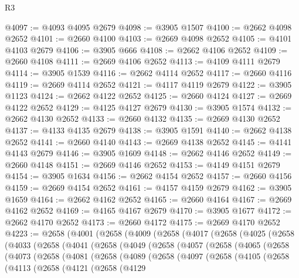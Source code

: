 \begin{lexlean}{R3}
\begin{coremodule}
@4097 := @4093 @4095 @2679
@4098 := @3905 @1507
@4100 := @2662 @4098 @2652
@4101 := @2660 @4100
@4103 := @2669 @4098 @2652
@4105 := @4101 @4103 @2679
@4106 := @3905 @666
@4108 := @2662 @4106 @2652
@4109 := @2660 @4108
@4111 := @2669 @4106 @2652
@4113 := @4109 @4111 @2679
@4114 := @3905 @1539
@4116 := @2662 @4114 @2652
@4117 := @2660 @4116
@4119 := @2669 @4114 @2652
@4121 := @4117 @4119 @2679
@4122 := @3905 @1123
@4124 := @2662 @4122 @2652
@4125 := @2660 @4124
@4127 := @2669 @4122 @2652
@4129 := @4125 @4127 @2679
@4130 := @3905 @1574
@4132 := @2662 @4130 @2652
@4133 := @2660 @4132
@4135 := @2669 @4130 @2652
@4137 := @4133 @4135 @2679
@4138 := @3905 @1591
@4140 := @2662 @4138 @2652
@4141 := @2660 @4140
@4143 := @2669 @4138 @2652
@4145 := @4141 @4143 @2679
@4146 := @3905 @1609
@4148 := @2662 @4146 @2652
@4149 := @2660 @4148
@4151 := @2669 @4146 @2652
@4153 := @4149 @4151 @2679
@4154 := @3905 @1634
@4156 := @2662 @4154 @2652
@4157 := @2660 @4156
@4159 := @2669 @4154 @2652
@4161 := @4157 @4159 @2679
@4162 := @3905 @1659
@4164 := @2662 @4162 @2652
@4165 := @2660 @4164
@4167 := @2669 @4162 @2652
@4169 := @4165 @4167 @2679
@4170 := @3905 @1677
@4172 := @2662 @4170 @2652
@4173 := @2660 @4172
@4175 := @2669 @4170 @2652
@4223 := @2658
    (@4001
      (@2658
        (@4009
          (@2658
            (@4017
              (@2658
                (@4025
                  (@2658
                    (@4033
                      (@2658
                        (@4041
                          (@2658
                            (@4049
                              (@2658
                                (@4057
                                  (@2658
                                    (@4065
                                      (@2658
                                        (@4073
                                          (@2658
                                            (@4081
                                              (@2658
                                                (@4089
                                                  (@2658
                                                    (@4097
                                                      (@2658
                                                        (@4105
                                                          (@2658
                                                            (@4113
                                                              (@2658
                                                                (@4121
                                                                  (@2658
                                                                    (@4129

\end{coremodule}
\end{lexlean}

